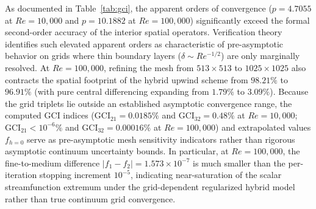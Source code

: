 \documentclass[11pt,a4paper]{article}
\begin{document}
\begin{table}[htbp]
\centering
\caption{Discretization verification using Richardson extrapolation and ASME V\&V 20-2009 / Roache Grid Convergence Index (GCI) for minimum streamfunction $\psi_{\min}$ with refinement ratio $r = 2.0$ and safety factor $F_s = 1.25$. Metrics are evaluated using full double-precision values ($|f_2 - f_1| = 1.573 \times 10^{-7}$ at $Re = 100{,}000$).}
\label{tab:gci}
\end{table}

As documented in Table~\ref{tab:gci}, the apparent orders of convergence ($p = 4.7055$ at $Re = 10{,}000$ and $p = 10.1882$ at $Re = 100{,}000$) significantly exceed the formal second-order accuracy of the interior spatial operators. Verification theory~\cite{roache1998verification,asme2009standard} identifies such elevated apparent orders as characteristic of pre-asymptotic behavior on grids where thin boundary layers ($\delta \sim Re^{-1/2}$) are only marginally resolved. At $Re = 100{,}000$, refining the mesh from $513 \times 513$ to $1025 \times 1025$ also contracts the spatial footprint of the hybrid upwind scheme from $98.21\%$ to $96.91\%$ (with pure central differencing expanding from $1.79\%$ to $3.09\%$). Because the grid triplets lie outside an established asymptotic convergence range, the computed GCI indices ($\text{GCI}_{21} = 0.0185\%$ and $\text{GCI}_{32} = 0.48\%$ at $Re = 10{,}000$; $\text{GCI}_{21} < 10^{-6}\%$ and $\text{GCI}_{32} = 0.00016\%$ at $Re = 100{,}000$) and extrapolated values $f_{h=0}$ serve as pre-asymptotic mesh sensitivity indicators rather than rigorous asymptotic continuum uncertainty bounds. In particular, at $Re = 100{,}000$, the fine-to-medium difference $|f_1 - f_2| = 1.573 \times 10^{-7}$ is much smaller than the per-iteration stopping increment $10^{-5}$, indicating near-saturation of the scalar streamfunction extremum under the grid-dependent regularized hybrid model rather than true continuum grid convergence.
\end{document}
